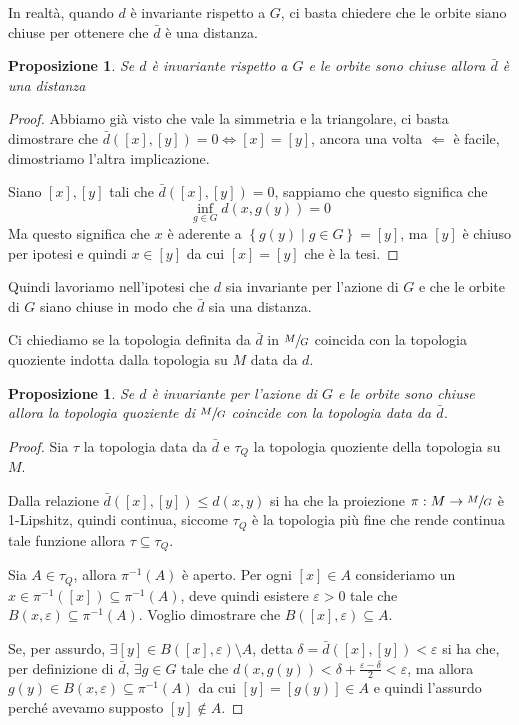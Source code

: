 \documentclass[a4paper,10pt]{article}
\newcounter{counter1}
\theoremstyle{plain}
\newtheorem{mypro}[counter1]{Proposizione}
\theoremstyle{definition}
\theoremstyle{remark}
\newcommand{\set}[1]{\left\{#1\right\}}
\newcommand{\bra}[1]{\left[#1\right]}
\begin{document}
In realtà, quando $d$ è invariante rispetto a $G$, ci basta chiedere
che le orbite siano chiuse per ottenere che $\bar d$ è una distanza.

\begin{mypro}
  Se $d$ è invariante rispetto a $G$ e le orbite sono chiuse allora
  $\bar d$ è una distanza
\end{mypro}
\begin{proof}
  Abbiamo già visto che vale la simmetria e la triangolare, ci basta
  dimostrare che $\bar d (\bra{x},\bra{y}) = 0 \Leftrightarrow \bra{x}
  = \bra{y}$, ancora una volta $\Leftarrow$ è facile, dimostriamo
  l'altra implicazione.

  Siano $\bra{x}, \bra{y}$ tali che $\bar d ( \bra{x} , \bra{y}) = 0$,
  sappiamo che questo significa che
  \[ \inf _{g \in G} d(x,g(y)) = 0 \]
  Ma questo significa che $x$ è aderente a $\set{g(y)\mid g \in G} =
  \bra{y}$, ma $\bra{y}$ è chiuso per ipotesi e quindi $x \in \bra{y}$
  da cui $\bra{x} = \bra{y}$ che è la tesi.
\end{proof}

Quindi lavoriamo nell'ipotesi che $d$ sia invariante per l'azione di
$G$ e che le orbite di $G$ siano chiuse in modo che $\bar d$ sia una
distanza.

Ci chiediamo se la topologia definita da $\bar d$ in $\sfrac{M}{G}$
coincida con la topologia quoziente indotta dalla topologia su $M$
data da $d$.
\begin{mypro}
  Se $d$ è invariante per l'azione di $G$ e le orbite sono chiuse
  allora la topologia quoziente di $\sfrac{M}{G}$ coincide con la
  topologia data da $\bar d$.
\end{mypro}
\begin{proof}
  Sia $\tau$ la topologia data da $\bar d$ e $\tau _Q$ la topologia
  quoziente della topologia su $M$.

  Dalla relazione $\bar d ( \bra{x}, \bra{y} ) \le d(x,y)$ si ha che
  la proiezione $\pi : M \to \sfrac{M}{G}$ è 1-Lipshitz, quindi
  continua, siccome $\tau _Q$ è la topologia più fine che rende
  continua tale funzione allora $\tau \subseteq \tau _Q$.

  Sia $A \in \tau _Q$, allora $\pi ^{-1}(A)$ è aperto. Per ogni
  $\bra{x} \in A$ consideriamo un $x \in \pi^{-1}(\bra{x}) \subseteq
  \pi ^{-1}(A)$, deve quindi esistere $\varepsilon >0$ tale che
  $B(x,\varepsilon) \subseteq \pi ^{-1}(A)$. Voglio dimostrare che
  $B(\bra{x}, \varepsilon ) \subseteq A$.

  Se, per assurdo, $\exists \bra{y} \in B(\bra{x}, \varepsilon )
  \setminus A$, detta $\delta = \bar d (\bra{x}, \bra{y}) <
  \varepsilon$ si ha che, per definizione di $\bar d$, $\exists g \in
  G$ tale che $d(x,g(y)) < \delta + \frac{\varepsilon - \delta}{2} <
  \varepsilon$, ma allora $g(y) \in B(x,\varepsilon) \subseteq \pi
  ^{-1} (A)$ da cui $\bra{y} = \bra{g(y)} \in A$ e quindi l'assurdo
  perché avevamo supposto $\bra{y} \not\in A$.
\end{proof}
\end{document}
